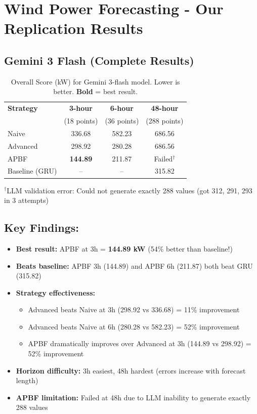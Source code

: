 \documentclass{article}
\begin{document}
\section*{Wind Power Forecasting - Our Replication Results}

\subsection*{Gemini 3 Flash (Complete Results)}

\begin{table}[h!]
\centering
\caption{Overall Score (kW) for Gemini 3-flash model. Lower is better. \textbf{Bold} = best result.}
\label{tab:gemini_results}
\begin{tabular}{lccc}
\toprule
\textbf{Strategy} & \textbf{3-hour} & \textbf{6-hour} & \textbf{48-hour} \\
& (18 points) & (36 points) & (288 points) \\
\midrule
Naive         & 336.68 & 582.23 & 686.56 \\
Advanced      & 298.92 & 280.28 & 686.56 \\
APBF          & \textbf{144.89} & 211.87 & Failed$^{\dagger}$ \\
\midrule
Baseline (GRU) & -- & -- & 315.82 \\
\bottomrule
\end{tabular}

\vspace{0.3cm}
\small{$^{\dagger}$LLM validation error: Could not generate exactly 288 values (got 312, 291, 293 in 3 attempts)}
\end{table}

\vspace{0.5cm}

\subsection*{Key Findings:}

\begin{itemize}
\item \textbf{Best result:} APBF at 3h = \textbf{144.89 kW} (54\% better than baseline!)
\item \textbf{Beats baseline:} APBF 3h (144.89) and APBF 6h (211.87) both beat GRU (315.82)
\item \textbf{Strategy effectiveness:}
  \begin{itemize}
  \item Advanced beats Naive at 3h (298.92 vs 336.68) = 11\% improvement
  \item Advanced beats Naive at 6h (280.28 vs 582.23) = 52\% improvement
  \item APBF dramatically improves over Advanced at 3h (144.89 vs 298.92) = 52\% improvement
  \end{itemize}
\item \textbf{Horizon difficulty:} 3h easiest, 48h hardest (errors increase with forecast length)
\item \textbf{APBF limitation:} Failed at 48h due to LLM inability to generate exactly 288 values
\end{itemize}
\end{document}
